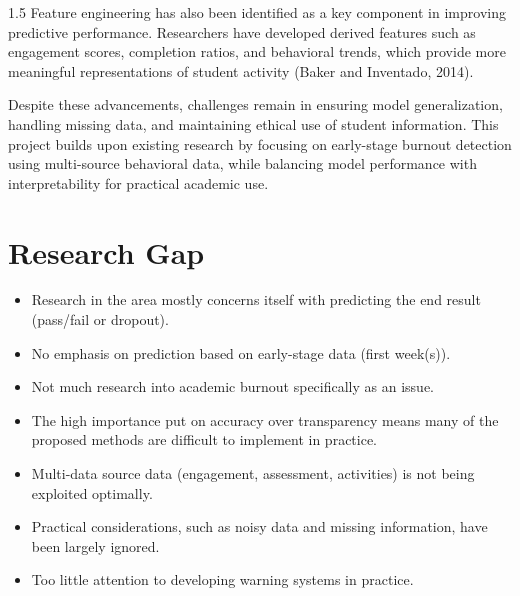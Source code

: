 \begin{spacing}{1.5}
Feature engineering has also been identified as a key component in improving predictive performance. Researchers have developed derived features such as engagement scores, completion ratios, and behavioral trends, which provide more meaningful representations of student activity (Baker and Inventado, 2014).

Despite these advancements, challenges remain in ensuring model generalization, handling missing data, and maintaining ethical use of student information. This project builds upon existing research by focusing on early-stage burnout detection using multi-source behavioral data, while balancing model performance with interpretability for practical academic use.
\paragraph{}

\section{Research Gap}

\begin{itemize}
    \item Research in the area mostly concerns itself with predicting the end result (pass/fail or dropout).

\item No emphasis on prediction based on early-stage data (first week(s)).

\item Not much research into academic burnout specifically as an issue.

\item The high importance put on accuracy over transparency means many of the proposed methods are difficult to implement in practice.

\item Multi-data source data (engagement, assessment, activities) is not being exploited optimally.

\item Practical considerations, such as noisy data and missing information, have been largely ignored.

\item Too little attention to developing warning systems in practice.

\end{itemize}

\paragraph{}




\end{spacing}
